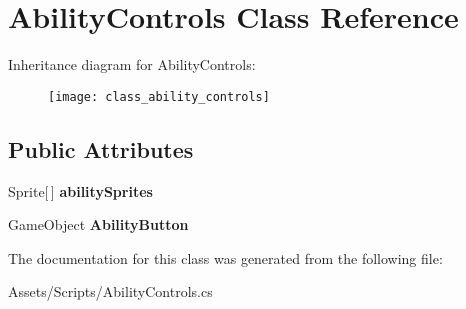 \hypertarget{class_ability_controls}{}\section{Ability\+Controls Class Reference}
\label{class_ability_controls}
Inheritance diagram for Ability\+Controls\+:\begin{figure}[H]
\begin{center}
\leavevmode
\texttt{[image: class\_ability\_controls]}
\end{center}
\end{figure}
\subsection*{Public Attributes}
\begin{DoxyCompactItemize}
\item 
Sprite\mbox{[}$\,$\mbox{]} {\bfseries ability\+Sprites}\hypertarget{class_ability_controls_a785b40e422476dc8a7e851f259c5a079}{}\label{class_ability_controls_a785b40e422476dc8a7e851f259c5a079}

\item 
Game\+Object {\bfseries Ability\+Button}\hypertarget{class_ability_controls_a00b6a4c8b1e9894d3dd04f24695b488d}{}\label{class_ability_controls_a00b6a4c8b1e9894d3dd04f24695b488d}

\end{DoxyCompactItemize}


The documentation for this class was generated from the following file\+:\begin{DoxyCompactItemize}
\item 
Assets/\+Scripts/Ability\+Controls.\+cs\end{DoxyCompactItemize}
